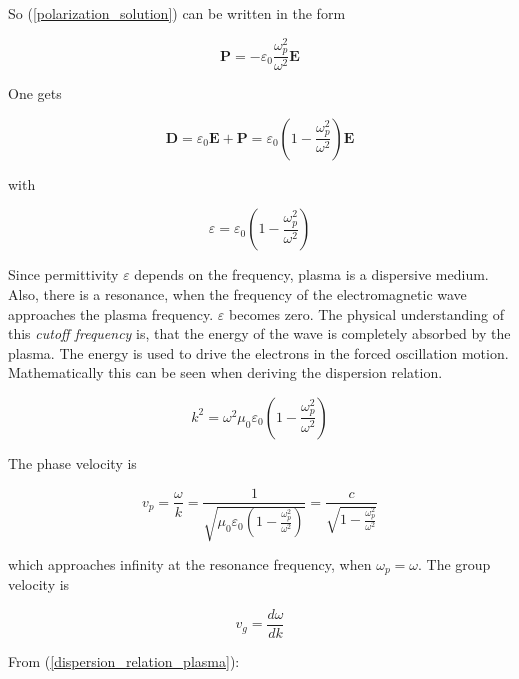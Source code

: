 \documentclass[a4paper,14pt]{extbook}
\begin{document}
So (\ref{polarization_solution}) can be written in the form

\begin{equation}\label{polarization_solution_2}
    \mathbf{P}=- \varepsilon_0\frac{\omega_p^2 }{ \omega^2 } \mathbf{E}
\end{equation}

One gets

\begin{equation}\label{D_plasma}
    \mathbf{D}=\varepsilon_0 \mathbf{E}+\mathbf{P}=\varepsilon_0 \left(1-\frac{\omega_p^2 }{ \omega^2 }\right)\mathbf{E}
\end{equation}

with

\begin{equation}\label{epsilon_plasma}
    \varepsilon=\varepsilon_0 \left(1-\frac{\omega_p^2 }{ \omega^2 }\right)
\end{equation}

Since permittivity $\varepsilon$ depends on the frequency, plasma is a dispersive medium. Also, there is a resonance, when the frequency of the electromagnetic wave approaches the plasma frequency. $\varepsilon$ becomes zero. The physical understanding of this \emph{cutoff frequency} is, that the energy of the wave is completely absorbed by the plasma. The energy is used to drive the electrons in the forced oscillation motion. Mathematically this can be seen when deriving the dispersion relation.

\begin{equation}\label{dispersion_relation_plasma}
    k^2=\omega^2\mu_0\varepsilon_0 \left(1-\frac{\omega_p^2 }{ \omega^2 }\right)
\end{equation}

The phase velocity is

\begin{equation}\label{phasespeed_plasma}
    v_p=\frac{\omega}{k}=\frac{1}{\sqrt{\mu_0\varepsilon_0 \left(1-\frac{\omega_p^2 }{ \omega^2 }\right)}}= \frac{c}{ \sqrt{1-\frac{\omega_p^2 }{ \omega^2 }}}
\end{equation}

which approaches infinity at the resonance frequency, when $\omega_p = \omega$. The group velocity is

\begin{equation}\label{groupspeed_plasma}
    v_g=\frac{d\omega}{dk}
\end{equation}

From (\ref{dispersion_relation_plasma}):
\end{document}
